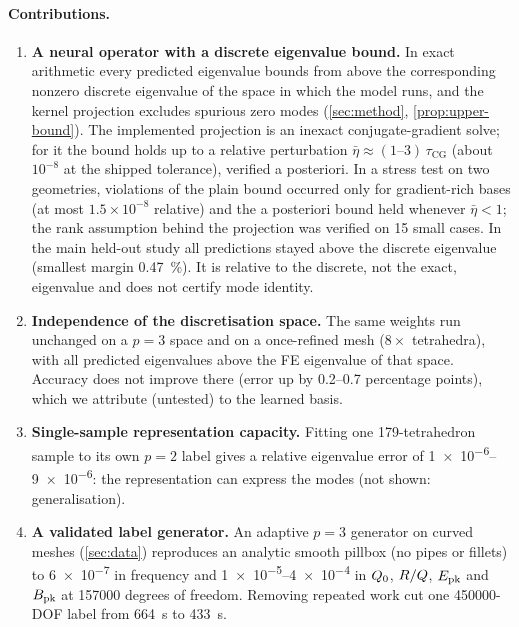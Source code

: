 \paragraph{Contributions.}
\begin{enumerate}
  \item \textbf{A neural operator with a discrete eigenvalue bound.}
  In exact arithmetic every predicted eigenvalue bounds from above the corresponding nonzero discrete eigenvalue of the space in which the model runs, and the kernel projection excludes spurious zero modes (\cref{sec:method}, \cref{prop:upper-bound}).
  The implemented projection is an inexact conjugate-gradient solve; for it the bound holds up to a relative perturbation $\bar\eta\approx(1\text{--}3)\,\tau_{\mathrm{CG}}$ (about $10^{-8}$ at the shipped tolerance), verified a posteriori. %
  In a stress test on two geometries, violations of the plain bound occurred only for gradient-rich bases (at most $1.5\times10^{-8}$ relative) and the a posteriori bound held whenever $\bar\eta<1$; %
  the rank assumption behind the projection was verified on 15 small cases. %
  In the main held-out study all predictions stayed above the discrete eigenvalue (smallest margin \SI{0.47}{\percent}). %
  It is relative to the discrete, not the exact, eigenvalue and does not certify mode identity.
  \item \textbf{Independence of the discretisation space.}
  The same weights run unchanged on a $p=3$ space and on a once-refined mesh ($8\times$ tetrahedra), with all predicted eigenvalues above the FE eigenvalue of that space. %
  Accuracy does not improve there (error up by \numrange{0.2}{0.7} percentage points), which we attribute (untested) to the learned basis. %
  \item \textbf{Single-sample representation capacity.}
  Fitting one 179-tetrahedron sample to its own $p=2$ label gives a relative eigenvalue error of \numrange{1e-6}{9e-6}: the representation can express the modes (not shown: generalisation). %
  \item \textbf{A validated label generator.}
  An adaptive $p=3$ generator on curved meshes (\cref{sec:data}) reproduces an analytic smooth pillbox (no pipes or fillets) to \num{6e-7} in frequency and \numrange{1e-5}{4e-4} in $\Qz$, $R/Q$, $\Epk$ and $\Bpk$ at \num{157000} degrees of freedom. %
  Removing repeated work cut one \num{450000}-DOF label from \SI{664}{s} to \SI{433}{s}. %

\end{enumerate}
